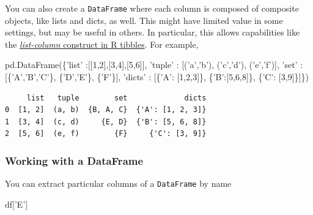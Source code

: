 \documentclass[
  letterpaper,
]{scrbook}
\newenvironment{Shaded}{\begin{snugshade}}{\end{snugshade}}
\newcommand{\DecValTok}[1]{\textcolor[rgb]{0.00,0.00,0.81}{#1}}
\newcommand{\NormalTok}[1]{#1}
\newcommand{\StringTok}[1]{\textcolor[rgb]{0.31,0.60,0.02}{#1}}
\begin{document}
You can also create a \texttt{DataFrame} where each column is composed of composite objects, like lists and dicts, as well. This might have limited value in some settings, but may be useful in others. In particular, this allows capabilities like the \href{https://jennybc.github.io/purrr-tutorial/ls13_list-columns.html}{\emph{list-column} construct in R tibbles}. For example,

\begin{Shaded}
\begin{Highlighting}[]
\NormalTok{pd.DataFrame(\{}\StringTok{'list'}\NormalTok{ :[[}\DecValTok{1}\NormalTok{,}\DecValTok{2}\NormalTok{],[}\DecValTok{3}\NormalTok{,}\DecValTok{4}\NormalTok{],[}\DecValTok{5}\NormalTok{,}\DecValTok{6}\NormalTok{]],}
             \StringTok{'tuple'}\NormalTok{ : [(}\StringTok{'a'}\NormalTok{,}\StringTok{'b'}\NormalTok{), (}\StringTok{'c'}\NormalTok{,}\StringTok{'d'}\NormalTok{), (}\StringTok{'e'}\NormalTok{,}\StringTok{'f'}\NormalTok{)],}
              \StringTok{'set'}\NormalTok{ : [\{}\StringTok{'A'}\NormalTok{,}\StringTok{'B'}\NormalTok{,}\StringTok{'C'}\NormalTok{\}, \{}\StringTok{'D'}\NormalTok{,}\StringTok{'E'}\NormalTok{\}, \{}\StringTok{'F'}\NormalTok{\}], }
            \StringTok{'dicts'}\NormalTok{ : [\{}\StringTok{'A'}\NormalTok{: [}\DecValTok{1}\NormalTok{,}\DecValTok{2}\NormalTok{,}\DecValTok{3}\NormalTok{]\}, \{}\StringTok{'B'}\NormalTok{:[}\DecValTok{5}\NormalTok{,}\DecValTok{6}\NormalTok{,}\DecValTok{8}\NormalTok{]\}, \{}\StringTok{'C'}\NormalTok{: [}\DecValTok{3}\NormalTok{,}\DecValTok{9}\NormalTok{]\}]\})}
\end{Highlighting}
\end{Shaded}

\begin{verbatim}
     list   tuple        set             dicts
0  [1, 2]  (a, b)  {B, A, C}  {'A': [1, 2, 3]}
1  [3, 4]  (c, d)     {E, D}  {'B': [5, 6, 8]}
2  [5, 6]  (e, f)        {F}     {'C': [3, 9]}
\end{verbatim}

\hypertarget{working-with-a-dataframe}{%
\subsubsection{Working with a DataFrame}\label{working-with-a-dataframe}}

You can extract particular columns of a \texttt{DataFrame} by name

\begin{Shaded}
\begin{Highlighting}[]
\NormalTok{df[}\StringTok{'E'}\NormalTok{]}
\end{Highlighting}
\end{Shaded}
\end{document}

